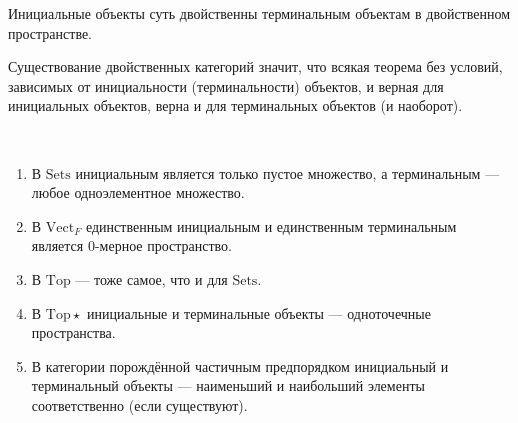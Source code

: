 \documentclass[12pt,a4paper]{article}
\newcommand{\Sets}{\mathrm{Sets}}
\newcommand{\Vect}{\mathrm{Vect}}
\newcommand{\Top}{\mathrm{Top}}
\newcommand{\Topstar}{\mathrm{Top\star}}
\begin{document}
    \begin{remark*}
        Инициальные объекты суть двойственны терминальным объектам в двойственном пространстве.
        
        Существование двойственных категорий значит, что всякая теорема без условий, зависимых от инициальности (терминальности) объектов, и верная для инициальных объектов, верна и для терминальных объектов (и наоборот).
    \end{remark*}

    \begin{example}\ 
        \begin{enumerate}
            \item В $\Sets$ инициальным является только пустое множество, а терминальным --- любое одноэлементное множество.
            \item В $\Vect_F$ единственным инициальным и единственным терминальным является $0$-мерное пространство.
            \item В $\Top$ --- тоже самое, что и для $\Sets$.
            \item В $\Topstar$ инициальные и терминальные объекты --- одноточечные пространства.
            \item В категории порождённой частичным предпорядком инициальный и терминальный объекты --- наименьший и наибольший элементы соответственно (если существуют).
        \end{enumerate}
    \end{example}
\end{document}
